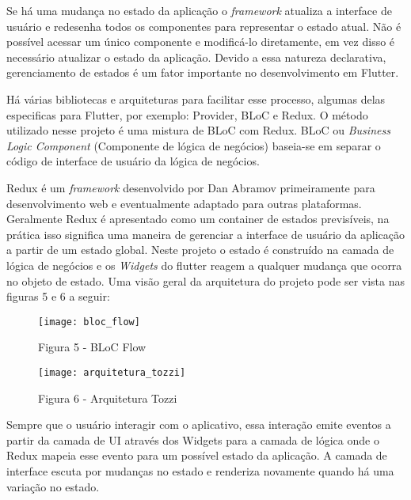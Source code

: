 Se há uma mudança no estado da aplicação o \textit{framework} atualiza a interface de usuário e redesenha todos os componentes para representar o estado atual. Não é possível acessar um único componente e modificá-lo diretamente, em vez disso é necessário atualizar o estado da aplicação. Devido a essa natureza declarativa, gerenciamento de estados é um fator importante no desenvolvimento em Flutter.

Há várias bibliotecas e arquiteturas para facilitar esse processo, algumas delas especificas para Flutter, por exemplo: Provider, BLoC e Redux. O método utilizado nesse projeto é uma mistura de BLoC com Redux. BLoC ou \textit{Business Logic Component} (Componente de lógica de negócios) baseia-se em separar o código de interface de usuário da lógica de negócios. 


Redux é um \textit{framework} desenvolvido por Dan Abramov primeiramente para desenvolvimento web e eventualmente adaptado para outras plataformas. Geralmente Redux é apresentado como um container de estados previsíveis, na prática isso significa uma maneira de gerenciar a interface de usuário da aplicação a partir de um estado global. Neste projeto o estado é construído na camada de lógica de negócios e os \textit{Widgets} do flutter reagem a qualquer mudança que ocorra no objeto de estado. Uma visão geral da arquitetura do projeto pode ser vista nas figuras 5 e 6 a seguir:

\begin{figure}[H]
	\caption{\label{fig:bloc_flow}Figura 5 - BLoC Flow}
	\begin{center}
		\texttt{[image: bloc\_flow]}
	\end{center}
\end{figure}



\begin{figure}[H]
	\caption{\label{fig:arquitetura_tozzi}Figura 6 - Arquitetura Tozzi}
	\begin{center}
		\texttt{[image: arquitetura\_tozzi]}
	\end{center}
\end{figure}

Sempre que o usuário interagir com o aplicativo, essa interação emite eventos a partir da camada de UI através dos Widgets para a camada de lógica onde o Redux mapeia esse evento para um possível estado da aplicação. A camada de interface escuta por mudanças no estado e renderiza novamente quando há uma variação no estado.

